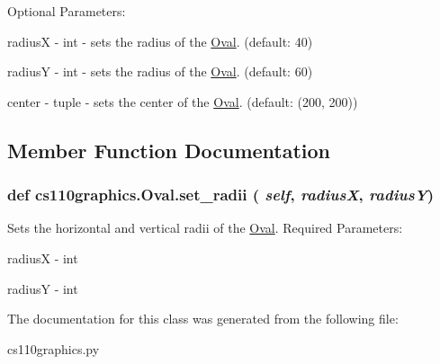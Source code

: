Optional Parameters:
\begin{DoxyItemize}
\item radiusX -\/ int -\/ sets the radius of the \hyperlink{classcs110graphics_1_1Oval}{Oval}. (default: 40)
\item radiusY -\/ int -\/ sets the radius of the \hyperlink{classcs110graphics_1_1Oval}{Oval}. (default: 60)
\item center -\/ tuple -\/ sets the center of the \hyperlink{classcs110graphics_1_1Oval}{Oval}. (default: (200, 200)) 
\end{DoxyItemize}

\subsection{Member Function Documentation}
\hypertarget{classcs110graphics_1_1Oval_a5d699cffc26c514e0eb9bdfde9a2951b}{
\subsubsection[{set\_\-radii}]{\setlength{\rightskip}{0pt plus 5cm}def cs110graphics.Oval.set\_\-radii ( {\em self}, \/   {\em radiusX}, \/   {\em radiusY})}}
\label{classcs110graphics_1_1Oval_a5d699cffc26c514e0eb9bdfde9a2951b}


Sets the horizontal and vertical radii of the \hyperlink{classcs110graphics_1_1Oval}{Oval}. Required Parameters:
\begin{DoxyItemize}
\item radiusX -\/ int
\item radiusY -\/ int 
\end{DoxyItemize}

The documentation for this class was generated from the following file:\begin{DoxyCompactItemize}
\item 
cs110graphics.py\end{DoxyCompactItemize}
